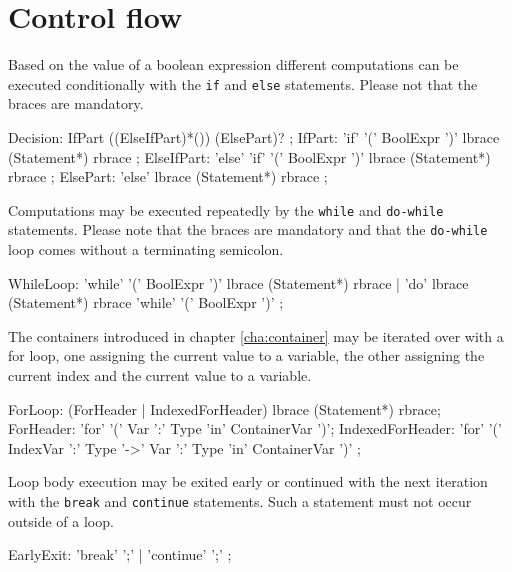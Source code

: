 \section{Control flow} \label{sub:controlflow}

Based on the value of a boolean expression different computations can be executed conditionally with the \texttt{if} and \texttt{else} statements. Please not that the braces are mandatory.

\begin{rail} 
  Decision: IfPart ((ElseIfPart)*()) (ElsePart)? ;
	IfPart: 'if' '(' BoolExpr ')' lbrace (Statement*) rbrace ;
	ElseIfPart: 'else' 'if' '(' BoolExpr ')' lbrace (Statement*) rbrace ;
	ElsePart: 'else' lbrace (Statement*) rbrace ;
\end{rail}

Computations may be executed repeatedly by the \texttt{while} and \texttt{do-while} statements. Please note that the braces are mandatory and that the \texttt{do-while} loop comes without a terminating semicolon.

\begin{rail} 
  WhileLoop: 
	'while' '(' BoolExpr ')' lbrace (Statement*) rbrace |
	'do' lbrace (Statement*) rbrace 'while' '(' BoolExpr ')' 
	;
\end{rail}


The containers introduced in chapter \ref{cha:container} may be iterated over with a for loop, one assigning the current value to a variable, the other assigning the current index and the current value to a variable.
\begin{rail}
  ForLoop: (ForHeader | IndexedForHeader) lbrace (Statement*) rbrace;
  ForHeader: 'for' '(' Var ':' Type 'in' ContainerVar ')';
  IndexedForHeader: 'for' '(' IndexVar ':' Type '->' Var ':' Type 'in' ContainerVar ')' ;
\end{rail}

Loop body execution may be exited early or continued with the next iteration with the \texttt{break} and \texttt{continue} statements. Such a statement must not occur outside of a loop.

\begin{rail} 
  EarlyExit: 
	'break' ';' |	'continue' ';'
	;
\end{rail}


